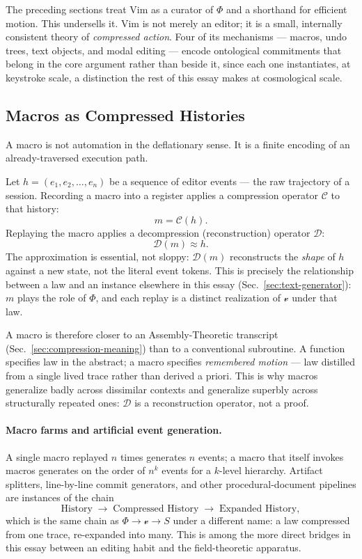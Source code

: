 \documentclass[12pt,a4paper]{article}
\theoremstyle{plain}
\theoremstyle{definition}
\theoremstyle{remark}
\newcommand{\Phifield}{\Phi}
\newcommand{\vfield}{\mathcal{v}}
\newcommand{\Sfield}{S}
\begin{document}
The preceding sections treat Vim as a curator of $\Phifield$ and a shorthand for efficient motion. This undersells it. Vim is not merely an editor; it is a small, internally consistent theory of \emph{compressed action}. Four of its mechanisms — macros, undo trees, text objects, and modal editing — encode ontological commitments that belong in the core argument rather than beside it, since each one instantiates, at keystroke scale, a distinction the rest of this essay makes at cosmological scale.

\subsection{Macros as Compressed Histories}
\label{subsec:macros-compressed}

A macro is not automation in the deflationary sense. It is a finite encoding of an already-traversed execution path.

Let $h = (e_1, e_2, \ldots, e_n)$ be a sequence of editor events — the raw trajectory of a session. Recording a macro into a register applies a compression operator $\mathcal{C}$ to that history:
\[
m = \mathcal{C}(h).
\]
Replaying the macro applies a decompression (reconstruction) operator $\mathcal{D}$:
\[
\mathcal{D}(m) \approx h.
\]
The approximation is essential, not sloppy: $\mathcal{D}(m)$ reconstructs the \emph{shape} of $h$ against a new state, not the literal event tokens. This is precisely the relationship between a law and an instance elsewhere in this essay (Sec.~\ref{sec:text-generator}): $m$ plays the role of $\Phifield$, and each replay is a distinct realization of $\vfield$ under that law.

A macro is therefore closer to an Assembly-Theoretic transcript (Sec.~\ref{sec:compression-meaning}) than to a conventional subroutine. A function specifies law in the abstract; a macro specifies \emph{remembered motion} — law distilled from a single lived trace rather than derived a priori. This is why macros generalize badly across dissimilar contexts and generalize superbly across structurally repeated ones: $\mathcal{D}$ is a reconstruction operator, not a proof.

\paragraph{Macro farms and artificial event generation.} A single macro replayed $n$ times generates $n$ events; a macro that itself invokes macros generates on the order of $n^k$ events for a $k$-level hierarchy. Artifact splitters, line-by-line commit generators, and other procedural-document pipelines are instances of the chain
\[
\text{History} \;\longrightarrow\; \text{Compressed History} \;\longrightarrow\; \text{Expanded History},
\]
which is the same chain as $\Phifield \to \vfield \to \Sfield$ under a different name: a law compressed from one trace, re-expanded into many. This is among the more direct bridges in this essay between an editing habit and the field-theoretic apparatus.
\end{document}

